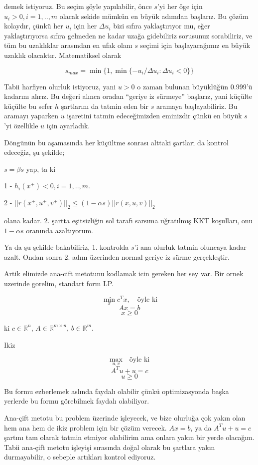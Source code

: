 \documentclass[12pt,fleqn]{article}\usepackage{../../common}
\begin{document}
demek istiyoruz. Bu seçim şöyle yapılabilir, önce $s$'yi her öge için
$u_i > 0, i=1,..,m$ olacak sekide mümkün en büyük adımdan başlarız. Bu
çözüm kolaydır, çünkü her $u_i$ için her $\Delta u_i$ bizi sıfıra
yaklaştırıyor mu, eğer yaklaştırıyorsa sıfıra gelmeden ne kadar uzağa
gidebiliriz sorusunuz sorabiliriz, ve tüm bu uzaklıklar arasından en ufak
olanı $s$ seçimi için başlayacağımız en büyük uzaklık
olacaktır. Matematiksel olarak 

$$
s_{max} = \min \bigg\{
  1, \min \{ -u_i / \Delta u_i : \Delta u_i < 0  \}
\bigg\}
$$

Tabii harfiyen olurluk istiyoruz, yani $u > 0$ o zaman bulunan büyüklüğün
0.999'ü kadarını alırız. Bu değeri alınca oradan ``geriye iz sürmeye''
başlarız, yani küçülte küçülte bu sefer $h$ şartlarını da tatmin eden bir
$s$ aramaya başlayabiliriz. Bu aramayı yaparken $u$ işaretini tatmin
edeceğimizden eminizdir çünkü en büyük $s$'yi özellikle $u$ için ayarladık.

Döngünün bu aşamasında her küçültme sonrası alttaki şartları da kontrol
edeceğiz, şu şekilde;

$s = \beta s$ yap, ta ki 

1 - $h_i(x^+) < 0, i=1,..,m$. 

2 - $|| r(x^+, u^+, v^+) ||_2 \le (1-\alpha s) || r(x,u,v) ||_2 $

olana kadar. 2. şartta eşitsizliğin sol tarafı sarsıma uğratılmış KKT
koşulları, onu $1-\alpha s$ oranında azaltıyorum.

Ya da şu şekilde bakabiliriz, 1. kontrolda $s$'i ana olurluk tatmin
oluncaya kadar azalt. Ondan sonra 2. adım üzerinden normal geriye iz sürme
gerçekleştir. 

Artik elimizde ana-cift metotunu kodlamak icin gereken her sey var. Bir
ornek uzerinde gorelim, standart form LP. 

$$
\min_x c^T x, \quad \textrm{öyle ki}
$$
$$
Ax = b
$$
$$
x \ge 0
$$

ki $c \in \mathbb{R}^n$, $A \in \mathbb{R}^{m \times n}$, $b \in \mathbb{R}^m$.

Ikiz

$$
\max_{u,v} \quad \textrm{öyle ki}
$$
$$
A^T u + u = c
$$
$$
u \ge 0
$$

Bu formu ezberlemek aslında faydalı olabilir çünkü optimizasyonda başka
yerlerde bu formu görebilmek faydalı olabiliyor. 

Ana-çift metotu bu problem üzerinde işleyecek, ve bize olurluğa çok yakın
olan hem ana hem de ikiz problem için bir çözüm verecek. $Ax=b$, ya da
$A^T u + u = c$ şartını tam olarak tatmin etmiyor olabilirim ama onlara
yakın bir yerde olacağım. Tabii ana-çift metotu işleyişi sırasında doğal
olarak bu şartlara yakın durmayabilir, o sebeple artıkları kontrol
ediyoruz. 
\end{document}
